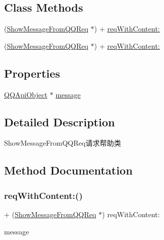 \subsection*{Class Methods}
\begin{DoxyCompactItemize}
\item 
(\mbox{\hyperlink{interface_show_message_from_q_q_req}{Show\+Message\+From\+Q\+Q\+Req}} $\ast$) + \mbox{\hyperlink{interface_show_message_from_q_q_req_a2e2c1650edb56da63200e52974d7b263}{req\+With\+Content\+:}}
\item 
(\mbox{\hyperlink{interface_show_message_from_q_q_req}{Show\+Message\+From\+Q\+Q\+Req}} $\ast$) + \mbox{\hyperlink{interface_show_message_from_q_q_req_a2e2c1650edb56da63200e52974d7b263}{req\+With\+Content\+:}}
\end{DoxyCompactItemize}
\subsection*{Properties}
\begin{DoxyCompactItemize}
\item 
\mbox{\hyperlink{interface_q_q_api_object}{Q\+Q\+Api\+Object}} $\ast$ \mbox{\hyperlink{interface_show_message_from_q_q_req_a4be2560234bc92e36b5c63fe1c0e57f4}{message}}
\end{DoxyCompactItemize}


\subsection{Detailed Description}
Show\+Message\+From\+Q\+Q\+Req请求帮助类 

\subsection{Method Documentation}
\mbox{\label{interface_show_message_from_q_q_req_a2e2c1650edb56da63200e52974d7b263}} 
\subsubsection{\texorpdfstring{req\+With\+Content\+:()}{reqWithContent:()}\hspace{0.1cm}{\footnotesize\ttfamily [1/2]}}
{\footnotesize\ttfamily + (\mbox{\hyperlink{interface_show_message_from_q_q_req}{Show\+Message\+From\+Q\+Q\+Req}} $\ast$) req\+With\+Content\+: \begin{DoxyParamCaption}\item[{(\mbox{\hyperlink{interface_q_q_api_object}{Q\+Q\+Api\+Object}} $\ast$)}]{message }\end{DoxyParamCaption}}

